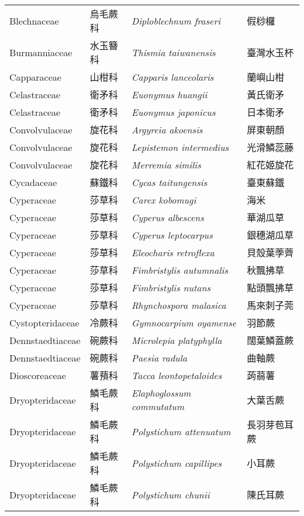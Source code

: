 \begin{longtable}{p{3cm}p{2cm}p{5cm}p{3cm}}
    Blechnaceae & 烏毛蕨科 & \textit{Diploblechnum fraseri}  & 假桫欏\\
    Burmanniaceae & 水玉簪科 & \textit{Thismia taiwanensis}  & 臺灣水玉杯\\
    Capparaceae & 山柑科 & \textit{Capparis lanceolaris}  & 蘭嶼山柑\\
    Celastraceae & 衛矛科 & \textit{Euonymus huangii}  & 黃氏衛矛\\
    Celastraceae & 衛矛科 & \textit{Euonymus japonicus}  & 日本衛矛\\
    Convolvulaceae & 旋花科 & \textit{Argyreia akoensis}  & 屏東朝顏\\
    Convolvulaceae & 旋花科 & \textit{Lepistemon intermedius}  & 光滑鱗蕊藤\\
    Convolvulaceae & 旋花科 & \textit{Merremia similis}  & 紅花姬旋花\\
    Cycadaceae & 蘇鐵科 & \textit{Cycas taitungensis}  & 臺東蘇鐵\\
    Cyperaceae & 莎草科 & \textit{Carex kobomugi}  & 海米\\
    Cyperaceae & 莎草科 & \textit{Cyperus albescens}  & 華湖瓜草\\
    Cyperaceae & 莎草科 & \textit{Cyperus leptocarpus}  & 銀穗湖瓜草\\
    Cyperaceae & 莎草科 & \textit{Eleocharis retroflexa}  & 貝殼葉荸薺\\
    Cyperaceae & 莎草科 & \textit{Fimbristylis autumnalis}  & 秋飄拂草\\
    Cyperaceae & 莎草科 & \textit{Fimbristylis nutans}  & 點頭飄拂草\\
    Cyperaceae & 莎草科 & \textit{Rhynchospora malasica}  & 馬來刺子莞\\
    Cystopteridaceae & 冷蕨科 & \textit{Gymnocarpium oyamense}  & 羽節蕨\\
    Dennstaedtiaceae & 碗蕨科 & \textit{Microlepia platyphylla}  & 闊葉鱗蓋蕨\\
    Dennstaedtiaceae & 碗蕨科 & \textit{Paesia radula}  & 曲軸蕨\\
    Dioscoreaceae & 薯蕷科 & \textit{Tacca leontopetaloides}  & 蒟蒻薯\\
    Dryopteridaceae & 鱗毛蕨科 & \textit{Elaphoglossum commutatum}  & 大葉舌蕨\\
    Dryopteridaceae & 鱗毛蕨科 & \textit{Polystichum attenuatum}  & 長羽芽苞耳蕨\\
    Dryopteridaceae & 鱗毛蕨科 & \textit{Polystichum capillipes}  & 小耳蕨\\
    Dryopteridaceae & 鱗毛蕨科 & \textit{Polystichum chunii}  & 陳氏耳蕨\\

\end{longtable}
